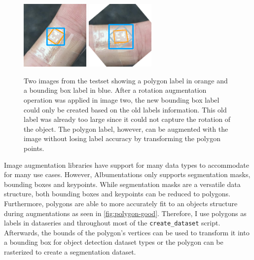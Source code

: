 \documentclass[10pt]{book}
\newcommand{\figureref}[1]{\autoref{#1}}
\begin{document}
\begin{figure}
  \centering
     {\includegraphics[width=0.3\textwidth]{image/polygon_pog_1}}
     {\includegraphics[width=0.3\textwidth]{image/polygon_pog_2}}
  \caption{Two images from the testset showing a polygon label in orange and a bounding box label in blue. After a rotation augmentation operation was applied in image two, the new bounding box label could only be created based on the old labels information. This old label was already too large since it could not capture the rotation of the object. The polygon label, however, can be augmented with the image without losing label accuracy by transforming the polygon points.}
  \label{fig:polygon-good}
\end{figure}

Image augmentation libraries have support for many data types to accommodate for many use cases. However, Albumentations only supports segmentation masks, bounding boxes and keypoints. While segmentation masks are a versatile data structure, both bounding boxes and keypoints can be reduced to polygons. Furthermore, polygons are able to more accurately fit to an objects structure during augmentations as seen in \figureref{fig:polygon-good}. Therefore, I use polygons as labels in dataseries and throughout most of the \texttt{create\_dataset} script. Afterwards, the bounds of the polygon's vertices can be used to transform it into a bounding box for object detection dataset types or the polygon can be rasterized to create a segmentation dataset.
\end{document}
